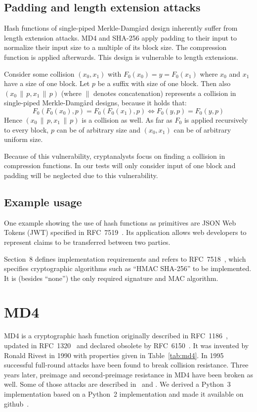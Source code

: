 \subsection{Padding and length extension attacks}
\label{sec:hash-length-ext-attack}
%
Hash functions of single-piped Merkle-Damg\aa{}rd design inherently suffer
from length extension attacks. MD4 and SHA-256 apply padding to their input
to normalize their input size to a multiple of its block size.
The compression function is applied afterwards. This design is vulnerable
to length extensions.

Consider some collision $(x_0, x_1)$ with $F_0(x_0) = y = F_0(x_1)$ where $x_0$ and
$x_1$ have a size of one block. Let $p$ be a suffix with size of one block.
Then also $(x_0 \,\|\, p, x_1 \,\|\, p)$ (where $\|$ denotes concatenation)
represents a collision in single-piped Merkle-Damg\aa{}rd designs, because
it holds that:
\[ F_0(F_0(x_0), p) = F_0(F_0(x_1), p) \iff F_0(y, p) = F_0(y, p) \]
Hence $(x_0 \,\|\, p, x_1 \,\|\, p)$ is a collision as well.
As far as $F_0$ is applied recursively to every block, $p$ can be of arbitrary size
and $(x_0, x_1)$ can be of arbitrary uniform size.

Because of this vulnerability, cryptanalysts focus on finding a collision
in compression functions. In our tests will only consider input of one block
and padding will be neglected due to this vulnerability.

\subsection{Example usage}
\label{sec:hash-usage}
%
One example showing the use of hash functions as primitives are JSON Web Tokens (JWT)
specified in RFC~7519~\cite{rfc7519}. Its application allows web developers to
represent claims to be transferred between two parties.

Section~8 defines implementation requirements and refers to RFC~7518~\cite{rfc7518},
which specifies cryptographic algorithms such as \enquote{HMAC SHA-256} to be
implemented. It is (besides \enquote{none}) the only required signature and MAC algorithm.

\section{MD4}
\label{sec:dc-md4}
%
MD4 is a cryptographic hash function originally described in RFC~1186~\cite{rfc1186},
updated in RFC~1320~\cite{rfc1320} and declared obsolete by RFC~6150~\cite{rfc6150}. It was
invented by Ronald Rivest in 1990 with properties given in Table~\ref{tab:md4}.
In 1995~\cite{Dobbertin1998} successful full-round attacks have been found to break collision resistance.
Three years later, preimage and second-preimage resistance in MD4 have been broken as well.
Some of those attacks are described in~\cite{md4-2007} and \cite{cryptoeprint:2005:151}.
We derived a Python~3 implementation based on a Python~2 implementation
and made it available on github~\cite{md4-py3k}.

